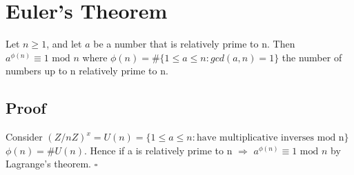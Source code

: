 \documentclass[12pt]{article}
\begin{document}
\section{Euler's Theorem}
Let \(n \geq 1\), and let \(a\) be a number that is relatively prime to n. 
Then \(a^{\phi(n)} \equiv 1 \text{ mod } n\) where 
\(\phi(n) = \#\{1 \leq a \leq n : gcd(a,n) = 1\}\) the number 
of numbers up to n relatively prime to n.

\subsection*{Proof}
Consider \((Z/nZ)^x = U(n) = \{1 \leq a \leq n : 
\text{have multiplicative inverses mod n}\}\)
\(\phi(n) = \#U(n)\). Hence if a is relatively prime to n \(\Rightarrow\)
\(a^{\phi(n)} \equiv 1 \text{ mod } n\) by Lagrange's theorem. \(\square\)
\end{document}
